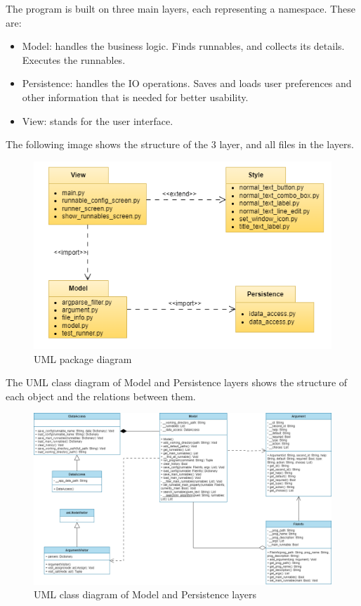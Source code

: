 \documentclass{article}
\begin{document}
The program is built on three main layers, each representing a namespace. These are:

\begin{itemize}
    \item Model: handles the business logic. Finds runnables, and collects its details. Executes the runnables.
    \item Persistence: handles the IO operations. Saves and loads user preferences and other information that is needed for better usability.
    \item View: stands for the user interface.
\end{itemize}

The following image shows the structure of the 3 layer, and all files in the layers. 

\begin{figure}[h]
    \centering
    \includegraphics[width=1\linewidth]{img/package_diagram.drawio.png}
    \caption{UML package diagram}
    \label{fig:enter-label}
\end{figure}

The UML class diagram of Model and Persistence layers shows the structure of each object and the relations between them.

\begin{figure}[h]
    \centering
    \includegraphics[width=1\linewidth]{img/class_diagram_model_persistence.drawio.png}
    \caption{UML class diagram of Model and Persistence layers}
    \label{fig:enter-label}
\end{figure}
\end{document}
